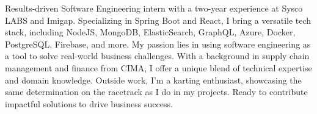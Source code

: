 \begin{cvparagraph}

    Results-driven Software Engineering intern with a two-year experience at Sysco LABS and Imigap. Specializing in Spring Boot and React, I bring a versatile tech stack, including NodeJS, MongoDB, ElasticSearch, GraphQL, Azure, Docker, PostgreSQL, Firebase, and more. My passion lies in using software engineering as a tool to solve real-world business challenges. With a background in supply chain management and finance from CIMA, I offer a unique blend of technical expertise and domain knowledge. Outside work, I'm a karting enthusiast, showcasing the same determination on the racetrack as I do in my projects. Ready to contribute impactful solutions to drive business success.

\end{cvparagraph}